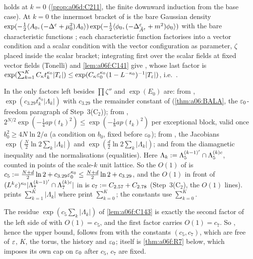 \begin{lemma}[{\cite[(3.21)]{Ba2}}]\label{lem:a06f:C142}
\cite[(3.5)]{Ba2} holds at $k=0$ (\cref{prop:a06d:C211}, the finite downward induction from the base case). At $k=0$ the innermost bracket of \cite[(3.5)]{Ba2} is the bare Gaussian density $\exp(-\frac12\langle A_0,(-\Delta^{\varepsilon}+\mu_0^2)A_0\rangle)\exp(-\frac12\langle \phi_0,(-\Delta^{\varepsilon}_{\tilde A^{\varepsilon}}+m^2)\phi_0\rangle)$ with the bare characteristic functions \cite[(2.34)--(2.42), (2.47)--(2.49)]{Ba2}; each characteristic function factorises into a vector condition and a scalar condition with the vector configuration as parameter, $\zeta$ placed inside the scalar bracket; integrating first over the scalar fields at fixed vector fields (Tonelli) and \cref{lem:a06f:C141} give \cite[(3.21)]{Ba2}, whose last factor is $\exp(\sum_{k=1}^KC_\kappa t_k^{\kappa_0}|T_{\varepsilon}|)\le\exp(C_\kappa\varepsilon_0^{\kappa_0}(1-L^{-\kappa_0})^{-1}|T_{\varepsilon}|)$, i.e.\ \cite[(2.118)]{Ba2}.
\end{lemma}

\begin{lemma}\label{lem:a06f:C143}
In \cite[(3.30)--(3.40)]{Ba2} the only factors left besides $\prod\zeta''$ and $\exp(E_0)$ are: from \cite[(3.31)]{Ba2}, $\exp(c_{3.29}t_k^{\kappa_0}|\Lambda_k|)$ with $c_{3.29}$ the remainder constant of \cite[Prop.~3.1, (3.29)]{Ba2} (\cref{thm:a06:BALA}, the $\varepsilon_0$-freedom paragraph of Step~3(C$_2$)); from \cite[(3.33)]{Ba2}, $2^{N/2}\exp(-\frac14ap(t_k)^2)\le\exp(-\frac18ap(t_k)^2)$ per exceptional block, valid once $b_0^2\ge4N\ln2/a$ (a condition on $b_0$, fixed before $\varepsilon_0$); from \cite[(3.36), (3.40)]{Ba2}, the Jacobians $\exp(\frac N2\ln2\sum_k|\Lambda_k|)$ and $\exp(\frac d2\ln2\sum_k|\Lambda_k|)$; and from \cite[(3.38)]{Ba2} the diamagnetic inequality and the normalisations \cite[(3.32)]{Ba2} (equalities). Here $\Lambda_k:=\Lambda^{(k-1)'}_5\cap\Lambda^{(k)c}_5$, counted in points of the scale-$k$ unit lattice. So the $O(1)$ of \cite[(3.39)--(3.40)]{Ba2} is $c_5:=\frac{N+d}2\ln2+c_{3.29}\varepsilon_0^{\kappa_0}\le\frac{N+d}2\ln2+c_{3.29}$, and the $O(1)$ in front of $(L^k\varepsilon)^{\kappa_0}|\Lambda^{(k-1)'}_7\cap\Lambda^{(k)c}_7|$ in \cite[(2.117), (3.42)]{Ba2} is $c_7:= C_{2.57}+C_{2.78}$ (Step~3(C$_2$), the $O(1)$ lines). \cite[(3.40)]{Ba2} prints $\sum_{k=1}^K|\Lambda_k|$ where \cite[(3.36), (3.42)]{Ba2} print $\sum_{k=0}^K$; the constants use $\sum_{k=0}^K$.
\end{lemma}

\begin{lemma}\label{lem:a06f:C144}
The residue $\exp(c_5\sum_k|\Lambda_k|)$ of \cref{lem:a06f:C143} is exactly the second factor of the left side of \cite[(3.42)]{Ba2} with $O(1)=c_5$, and the first factor carries $O(1)=c_7$. So \cite[(2.117)]{Ba2}, hence the upper bound, follows from \cite[(3.42)]{Ba2} with the constants $(c_5,c_7)$, which are free of $\varepsilon$, $K$, the torus, the history and $\varepsilon_0$; \cite[(3.42)]{Ba2} itself is \cref{thm:a06f:R7} below, which imposes its own cap on $\varepsilon_0$ after $c_5$, $c_7$ are fixed.
\end{lemma}

